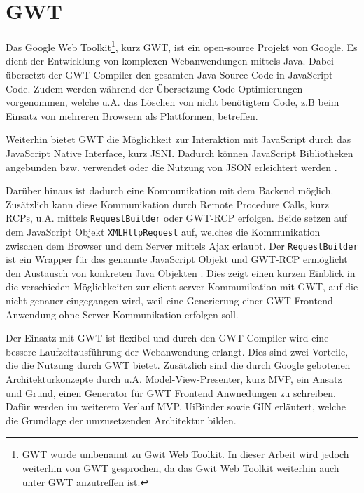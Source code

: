 \section{GWT}
\label{GWT}
Das Google Web Toolkit\footnote{GWT wurde umbenannt zu Gwit Web Toolkit. In dieser Arbeit wird jedoch
weiterhin von GWT gesprochen, da das Gwit Web Toolkit weiterhin auch unter GWT
anzutreffen ist.}, kurz GWT, ist ein open-source Projekt von Google.
Es dient der Entwicklung von komplexen Webanwendungen mittels Java.
Dabei übersetzt der GWT Compiler den gesamten Java Source-Code in JavaScript Code.
Zudem werden während der Übersetzung Code Optimierungen vorgenommen, welche u.A.
das Löschen von nicht benötigtem Code, z.B beim Einsatz von mehreren
Browsern als Plattformen, betreffen. 

Weiterhin bietet GWT die Möglichkeit zur Interaktion mit JavaScript durch
das JavaScript Native Interface, kurz JSNI.
Dadurch können JavaScript Bibliotheken angebunden bzw. verwendet oder die
Nutzung von JSON erleichtert werden \cite[S. 4-9]{bib:GWTinAction}\cite[S.
237-238]{bib:GWToReilly}.

Darüber hinaus ist dadurch eine Kommunikation mit dem Backend
möglich. Zusätzlich kann diese Kommunikation durch Remote Procedure Calls,
kurz RCPs, u.A. mittels \texttt{RequestBuilder} oder GWT-RCP erfolgen. Beide
setzen auf dem JavaScript Objekt \texttt{XMLHttpRequest} auf,
welches die Kommunikation zwischen dem Browser und dem Server mittels Ajax
erlaubt. Der \texttt{RequestBuilder} ist ein Wrapper für das genannte JavaScript
Objekt und GWT-RCP ermöglicht den Austausch von konkreten Java Objekten \cite[S. 16]{bib:GWTinAction}\cite[S.
222]{bib:GWToReilly}. Dies zeigt einen kurzen Einblick in die
verschieden Möglichkeiten zur client-server Kommunikation mit GWT, auf die nicht
genauer eingegangen wird, weil eine Generierung einer GWT
Frontend Anwendung ohne Server Kommunikation erfolgen soll.

Der Einsatz mit GWT ist flexibel und durch den GWT Compiler wird 
eine bessere Laufzeitausführung der Webanwendung erlangt\cite{bib:GWTStarted}.
Dies sind zwei Vorteile, die die Nutzung durch GWT bietet. Zusätzlich
sind die durch Google gebotenen Architekturkonzepte durch u.A.
Model-View-Presenter, kurz MVP, ein Ansatz und Grund, einen Generator für GWT
Frontend Anwnedungen zu schreiben.
Dafür werden im weiterem Verlauf MVP, UiBinder sowie GIN erläutert, welche die
Grundlage der umzusetzenden Architektur bilden.
